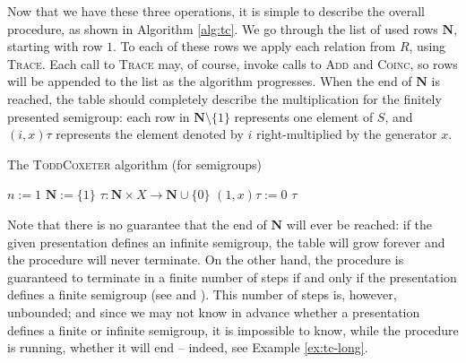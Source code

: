 Now that we have these three operations, it is simple to describe the overall
procedure, as shown in Algorithm \ref{alg:tc}.  We go through the list of used
rows $\mathbf{N}$, starting with row $1$.  To each
of these rows we apply each relation from $R$, using \textsc{Trace}.  Each call
to \textsc{Trace} may, of course, invoke calls to \textsc{Add} and
\textsc{Coinc}, so rows will be appended to the list as the algorithm
progresses.  When the end of $\mathbf{N}$ is reached, the table should
completely describe the multiplication for the finitely presented semigroup:
each row in $\mathbf{N} \setminus \{1\}$ represents one element of $S$, and
$(i, x)\tau$ represents the element denoted by $i$ right-multiplied by the
generator $x$.

\begin{algorithm}
\caption{The \textsc{ToddCoxeter} algorithm (for semigroups)}
\label{alg:tc}
\begin{algorithmic}[1]
\State $n := 1$
\State $\mathbf{N} := \{1\}$
\State $\tau : \mathbf{N} \times X \to \mathbf{N} \cup \{0\}$
  \State $(1, x)\tau := 0$
\EndFor
{}
    \State {}
  \EndFor
\EndFor
\State \Return $\tau$
\EndProcedure
\end{algorithmic}
\end{algorithm}

Note that there is no guarantee that the end of $\mathbf{N}$ will ever be
reached: if the given presentation defines an infinite semigroup, the table will
grow forever and the procedure will never terminate.  On the other hand, the
procedure is guaranteed to terminate in a finite number of steps if and only if
the presentation defines a finite semigroup (see \cite[Theorem 5.5]{cgt} and
\cite[Theorem 3]{beetham_campbell_1976}).  This number of steps is, however,
unbounded; and since we may not know in advance whether a presentation defines a
finite or infinite semigroup, it is impossible to know, while the procedure is
running, whether it will end -- indeed, see Example \ref{ex:tc-long}.

